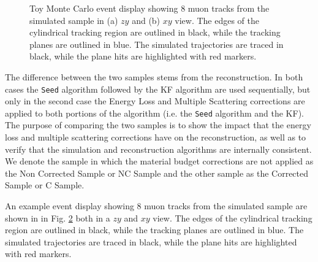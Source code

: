 \begin{figure}[t]
\begin{subfigure}[b]{0.48\textwidth}
         \caption{}
         \label{fig:XYViewGArLite}
     \end{subfigure}
        \caption[Toy Monte Carlo event display for ND-GAr-Lite.]{Toy Monte Carlo event display showing 8 muon tracks from the simulated sample in (a) $zy$ and (b) $xy$ view. The edges of the cylindrical tracking region are outlined in black, while the tracking planes are outlined in blue. The simulated trajectories are traced in black, while the plane hits are highlighted with red markers.} \label{fig:ViewGArLite}
\end{figure}

The difference between the two samples stems from the reconstruction. In both cases the \texttt{Seed} algorithm followed by the KF algorithm are used sequentially, but only in the second case the Energy Loss and Multiple Scattering corrections are applied to both portions of the algorithm (i.e. the \texttt{Seed} algorithm and the KF). The purpose of comparing the two samples is to show the impact that the energy loss and multiple scattering corrections have on the reconstruction, as well as to verify that the simulation and reconstruction algorithms are internally consistent. We denote the sample in which the material budget corrections are not applied as the Non Corrected Sample or NC Sample and the other sample as the Corrected Sample or C Sample.

An example event display showing 8 muon tracks from the simulated sample are shown in in Fig. \ref{fig:ViewGArLite} both in a $zy$ and $xy$ view. The edges of the cylindrical tracking region are outlined in black, while the tracking planes are outlined in blue. The simulated trajectories are traced in black, while the plane hits are highlighted with red markers.

